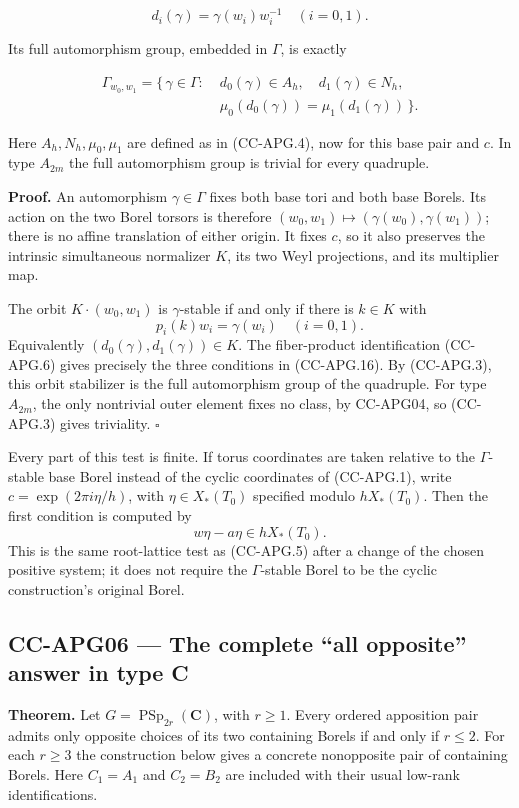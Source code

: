 \documentclass[11pt,a4paper]{article}
\theoremstyle{definition}\newtheorem{definition}[theorem]{Definition}
\theoremstyle{remark}\newtheorem{remark}[theorem]{Remark}
\begin{document}
\[
 d_i(\gamma)=\gamma(w_i)w_i^{-1}\quad(i=0,1).
\]

Its full automorphism group, embedded in \(\Gamma\), is exactly

\[
\begin{split}
 \Gamma_{w_0,w_1}=\{\,\gamma\in\Gamma:\;&
 d_0(\gamma)\in A_h,\quad d_1(\gamma)\in N_h,\\
 &\mu_0(d_0(\gamma))=\mu_1(d_1(\gamma))\,\}.
\end{split}
 \tag{CC-APG.16}
\]

Here \(A_h,N_h,\mu_0,\mu_1\) are defined as in (CC-APG.4), now for this
base pair and \(c\). In type \(A_{2m}\) the full automorphism group is
trivial for every quadruple.

\textbf{Proof.} An automorphism \(\gamma\in\Gamma\) fixes both base tori
and both base Borels. Its action on the two Borel torsors is therefore
\((w_0,w_1)\mapsto(\gamma(w_0),\gamma(w_1))\); there is no affine
translation of either origin. It fixes \(c\), so it also preserves the
intrinsic simultaneous normalizer \(K\), its two Weyl projections, and
its multiplier map.

The orbit \(K\cdot(w_0,w_1)\) is \(\gamma\)-stable if and only if there
is \(k\in K\) with \[
 p_i(k)w_i=\gamma(w_i)\quad(i=0,1).
\] Equivalently \((d_0(\gamma),d_1(\gamma))\in K\). The fiber-product
identification (CC-APG.6) gives precisely the three conditions in
(CC-APG.16). By (CC-APG.3), this orbit stabilizer is the full
automorphism group of the quadruple. For type \(A_{2m}\), the only
nontrivial outer element fixes no class, by CC-APG04, so (CC-APG.3)
gives triviality. \(\square\)

Every part of this test is finite. If torus coordinates are taken
relative to the \(\Gamma\)-stable base Borel instead of the cyclic
coordinates of (CC-APG.1), write \(c=\exp(2\pi i\eta/h)\), with
\(\eta\in X_*(T_0)\) specified modulo \(hX_*(T_0)\). Then the first
condition is computed by \[
 w\eta-a\eta\in hX_*(T_0).
\] This is the same root-lattice test as (CC-APG.5) after a change of
the chosen positive system; it does not require the \(\Gamma\)-stable
Borel to be the cyclic construction's original Borel.

\subsection{CC-APG06 --- The complete ``all opposite'' answer in type
C}\label{cc-apg06-the-complete-all-opposite-answer-in-type-c}

\textbf{Theorem.} Let \(G=\operatorname{PSp}_{2r}(\mathbf C)\), with
\(r\geq1\). Every ordered apposition pair admits only opposite choices
of its two containing Borels if and only if \(r\leq2\). For each
\(r\geq3\) the construction below gives a concrete nonopposite pair of
containing Borels. Here \(C_1=A_1\) and \(C_2=B_2\) are included with
their usual low-rank identifications.
\end{document}
